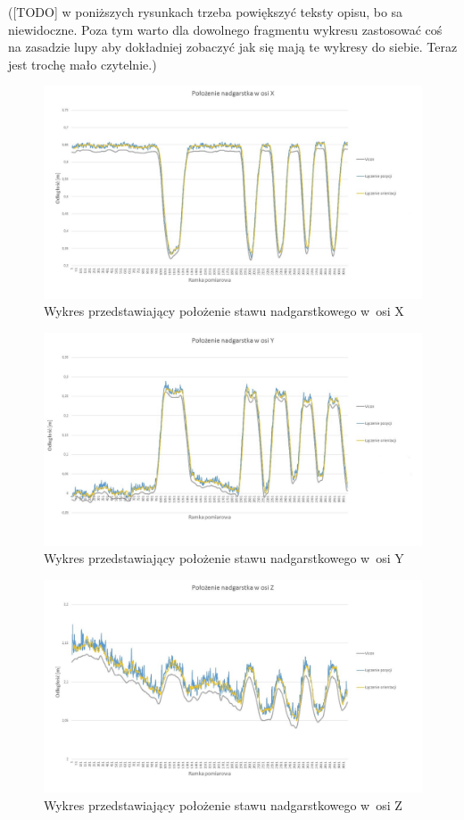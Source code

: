 ([TODO] w poniższych rysunkach trzeba powiększyć teksty opisu, bo sa niewidoczne. Poza tym warto dla dowolnego fragmentu wykresu zastosować coś na zasadzie lupy aby dokładniej zobaczyć jak się mają te wykresy do siebie. Teraz jest trochę mało czytelnie.)
\begin{figure}[!htb]
	\centering
	\includegraphics[width=0.9\linewidth]{images/100/Slide4.jpg}
	\caption{Wykres przedstawiający położenie stawu nadgarstkowego w~osi X}
	\label{fig:experiments:first:wristX}
\end{figure}


\begin{figure}[!htb]
	\centering
	\includegraphics[width=0.9\linewidth]{images/100/Slide5.jpg}
	\caption{Wykres przedstawiający położenie stawu nadgarstkowego w~osi Y}
	\label{fig:experiments:first:wristY}
\end{figure}

\begin{figure}[!htb]
	\centering
	\includegraphics[width=0.9\linewidth]{images/100/Slide6.jpg}
	\caption{Wykres przedstawiający położenie stawu nadgarstkowego w~osi Z}
	\label{fig:experiments:first:wristZ}
\end{figure}

